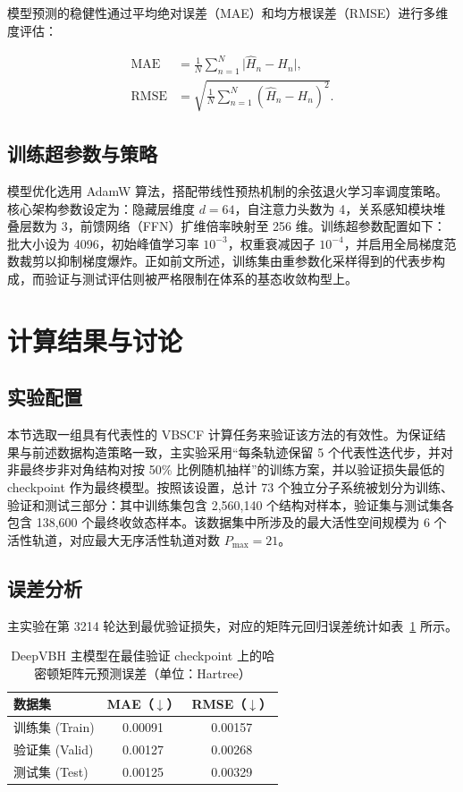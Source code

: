 模型预测的稳健性通过平均绝对误差（MAE）和均方根误差（RMSE）进行多维度评估：

\begin{align}
\mathrm{MAE} &= \frac{1}{N}\sum_{n=1}^{N}\lvert \hat{H}_n - H_n \rvert, \\
\mathrm{RMSE} &= \sqrt{\frac{1}{N}\sum_{n=1}^{N}\left(\hat{H}_n - H_n\right)^2}.
\end{align}

\subsection{训练超参数与策略}

模型优化选用 AdamW 算法，搭配带线性预热机制的余弦退火学习率调度策略\cite{kingma2015adam,loshchilov2019adamw,loshchilov2017sgdr}。核心架构参数设定为：隐藏层维度 $d = 64$，自注意力头数为 4，关系感知模块堆叠层数为 3，前馈网络（FFN）扩维倍率映射至 256 维。训练超参数配置如下：批大小设为 4096，初始峰值学习率 $10^{-3}$，权重衰减因子 $10^{-4}$，并启用全局梯度范数裁剪以抑制梯度爆炸。正如前文所述，训练集由重参数化采样得到的代表步构成，而验证与测试评估则被严格限制在体系的基态收敛构型上。

\section{计算结果与讨论}
\subsection{实验配置}

本节选取一组具有代表性的 VBSCF 计算任务来验证该方法的有效性。为保证结果与前述数据构造策略一致，主实验采用“每条轨迹保留 5 个代表性迭代步，并对非最终步非对角结构对按 50\% 比例随机抽样”的训练方案，并以验证损失最低的 checkpoint 作为最终模型。按照该设置，总计 73 个独立分子系统被划分为训练、验证和测试三部分：其中训练集包含 2,560,140 个结构对样本，验证集与测试集各包含 138,600 个最终收敛态样本。该数据集中所涉及的最大活性空间规模为 6 个活性轨道，对应最大无序活性轨道对数 $P_{\max} = 21$。
\subsection{误差分析}

主实验在第 3214 轮达到最优验证损失，对应的矩阵元回归误差统计如表~\ref{tab:deepvbh-metrics} 所示。

\begin{table}[htbp]
    \centering
    \caption{DeepVBH 主模型在最佳验证 checkpoint 上的哈密顿矩阵元预测误差（单位：Hartree）}
    \label{tab:deepvbh-metrics}
    \begin{tabular}{lcc}
        \toprule
        数据集 & MAE（$\downarrow$） & RMSE（$\downarrow$） \\
        \midrule
        训练集 (Train) & 0.00091 & 0.00157 \\
        验证集 (Valid) & 0.00127 & 0.00268 \\
        测试集 (Test)  & 0.00125 & 0.00329 \\
        \bottomrule
    \end{tabular}
\end{table}

